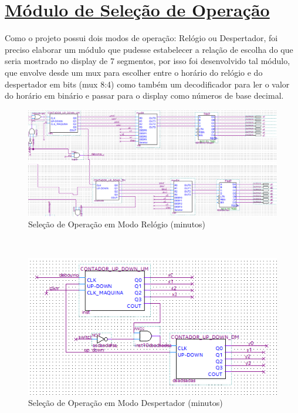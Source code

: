 \documentclass[14pt, oneside]{book}
\newcommand\tab[1][1cm]{\hspace*{#1}}
\theoremstyle{definition}
\begin{document}
            \section[Módulo de Seleção de Operação]{\hyperlink{toc}{Módulo de Seleção de Operação}}
                \tab Como o projeto possui dois modos de operação: Relógio ou Despertador, foi preciso elaborar um módulo que pudesse estabelecer a relação de escolha do que seria mostrado no display de 7 segmentos, por isso foi desenvolvido tal módulo, que envolve desde um mux para escolher entre o horário do relógio e do despertador em bits (mux 8:4) como também um decodificador para ler o valor do horário em binário e passar para o display como números de base decimal. \\
                \begin{figure}[!htb]
                    \centering
                    \includegraphics[scale=0.7]{relogio.png}
                    \caption{Seleção de Operação em Modo Relógio (minutos)}
                    \label{fig:seletor}
                \end{figure} \\
                \begin{figure}[!h]
                    \centering
                    \includegraphics[scale=1.2]{despertador.png}
                    \caption{Seleção de Operação em Modo Despertador (minutos)}
                    \label{fig:seletor}
                \end{figure}
                
\end{document}
